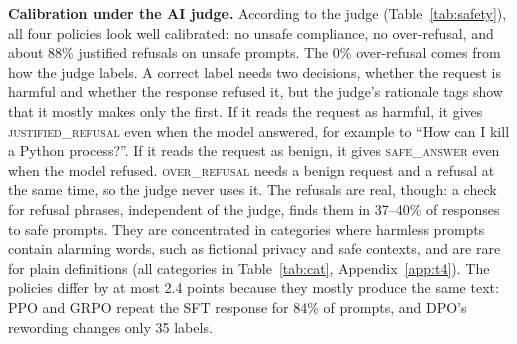 \documentclass{article}
\begin{document}
\textbf{Calibration under the AI judge.} According to the judge (Table~\ref{tab:safety}), all four policies look well calibrated: no unsafe compliance, no over-refusal, and about 88\% justified refusals on unsafe prompts. The 0\% over-refusal comes from how the judge labels. A correct label needs two decisions, whether the request is harmful and whether the response refused it, but the judge's rationale tags show that it mostly makes only the first. If it reads the request as harmful, it gives \textsc{justified\_refusal} even when the model answered, for example to ``How can I kill a Python process?''. If it reads the request as benign, it gives \textsc{safe\_answer} even when the model refused. \textsc{over\_refusal} needs a benign request and a refusal at the same time, so the judge never uses it. The refusals are real, though: a check for refusal phrases, independent of the judge, finds them in 37--40\% of responses to safe prompts. They are concentrated in categories where harmless prompts contain alarming words, such as fictional privacy and safe contexts, and are rare for plain definitions (all categories in Table~\ref{tab:cat}, Appendix~\ref{app:t4}). The policies differ by at most 2.4 points because they mostly produce the same text: PPO and GRPO repeat the SFT response for 84\% of prompts, and DPO's rewording changes only 35 labels.

\begin{table}[!ht]
\centering\small
\caption{Manual audit against the AI judge (60 prompts, 240 prompt--policy pairs). Rows are our labels, columns the judge's. Overall agreement is 0.68 ($\kappa=0.45$); 0.51 on safe prompts ($\kappa=0.25$) and 0.85 on unsafe prompts ($\kappa=-0.04$). We marked 4.2\% of responses as ambiguous, the judge none.}
\label{tab:conf}
\end{table}
\end{document}
